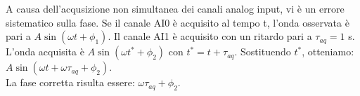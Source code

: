 \documentclass[../Relazione_circuiti]{subfiles}
\begin{document}
A causa dell'acqusizione non simultanea dei canali analog input, vi è un errore sistematico sulla fase.
Se il canale AI0 è acquisito al tempo t, l'onda osservata è pari a $A\sin(\omega t +\phi_1)$.
Il canale AI1 è acquisito con un ritardo pari a $\tau_{aq} = 1$ \textmu s.
L'onda acquisita è $A\sin(\omega t^* +\phi_2)$ con $t^*=t+\tau_{aq}$.
Sostituendo $t^*$, otteniamo: $ A\sin(\omega t + \omega \tau_{aq} + \phi_2)$. \\
La fase corretta risulta essere: $\omega \tau_{aq} + \phi_2$.
\end{document}
